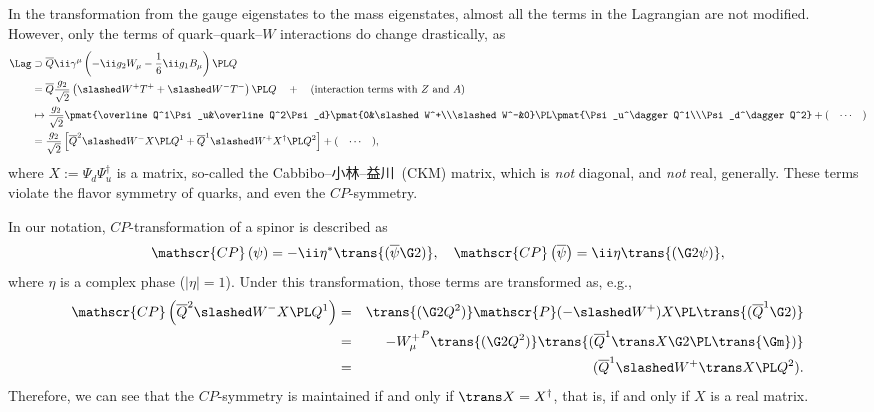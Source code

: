 In the transformation from the gauge eigenstates to the mass eigenstates, almost all the terms in the Lagrangian are not modified.
However, only the terms of quark--quark--$W$ interactions do change drastically, as
\begin{align}
 \Lag
&\supset
 \overline Q\ii\gamma^\mu\left(-\ii g_2W_\mu-\frac16\ii g_1B_\mu\right)\PL Q\\
&=\overline Q\frac{g_2}{\sqrt2}\left(\slashed W^+ T^+ + \slashed W^- T^-\right)\PL Q
\quad+\quad(\text{interaction terms with $Z$ and $A$})\\
&\mapsto%
\frac{g_2}{\sqrt2}
\pmat{\overline Q^1\Psi_u&\overline Q^2\Psi_d}
\pmat{0&\slashed W^+\\\slashed W^-&0}\PL\pmat{\Psi_u^\dagger Q^1\\\Psi_d^\dagger Q^2} + (\quad{\cdots}\quad)\\
&=\frac{g_2}{\sqrt2}\left[\overline Q^2\slashed W^-X \PL Q^1+ \overline Q^1\slashed W^+X^\dagger\PL Q^2\right]+(\quad{\cdots}\quad),
\end{align}
where $X:=\Psi_d\Psi_u^\dagger$ is a matrix, so-called the Cabbibo--小林--益川~(CKM) matrix, which is {\em not} diagonal, and {\em not} real, generally.
These terms violate the flavor symmetry of quarks, and even the $CP$-symmetry.
\begin{rightnote}
In our notation, $CP$-transformation of a spinor is described as
\begin{equation}
 \mathscr{CP}\left(\psi\right)= -\ii\eta^*\trans{(\overline\psi\G2)},\quad
 \mathscr{CP}\left(\overline\psi\right)= \ii\eta\trans{(\G2\psi)},
\end{equation}
where $\eta$ is a complex phase ($|\eta|=1$).
Under this transformation, those terms are transformed as, e.g.,
\begin{eqnarray}
\mathscr{CP}\left( \overline Q^2\slashed W^-X \PL Q^1\right)
&=&
\trans{(\G2Q^2)} \mathscr{P}(-{\slashed W^+})X\PL\trans{(\overline Q^1\G2)}\notag\\
&=&-{W_\mu^+}^P\trans{(\G2Q^2)}\trans{(\overline Q^1\trans X\G2\PL\trans{\Gm })}\\
&=&(\overline Q^1{\slashed W^+}\trans X\PL Q^2).\notag
\end{eqnarray}
Therefore, we can see that the $CP$-symmetry is maintained if and only if $\trans X=X^\dagger$, that is, if and only if $X$ is a real matrix.
\end{rightnote}

